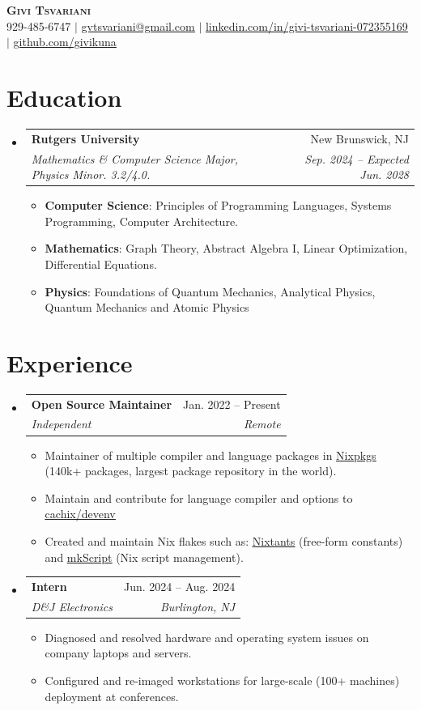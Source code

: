 \documentclass[letterpaper,11pt]{article}
\makeatletter
\newcommand{\resumeItem}[1]{
  \item\small{
    {#1 \vspace{-2pt}}
  }
}
\newcommand{\resumeSubheading}[4]{
  \vspace{-2pt}\item
    \begin{tabular*}{0.97\textwidth}[t]{l@{\extracolsep{\fill}}r}
      \textbf{#1} & #2 \\
      \textit{\small#3} & \textit{\small #4} \\
    \end{tabular*}\vspace{-7pt}
}
\newcommand{\resumeSubHeadingListStart}{\begin{itemize}[leftmargin=0.15in, label={}]}
\newcommand{\resumeSubHeadingListEnd}{\end{itemize}}
\newcommand{\resumeItemListStart}{\begin{itemize}}
\newcommand{\resumeItemListEnd}{\end{itemize}\vspace{-5pt}}
\makeatother
\begin{document}
\begin{center}
    \textbf{\Huge \scshape Givi Tsvariani} \\ \vspace{1pt}
    \small 929-485-6747 $|$ \href{mailto:gvtsvariani@gmail.com}{\underline{gvtsvariani@gmail.com}} $|$ 
    \href{https://linkedin.com/in/givi-tsvariani-072355169}{\underline{linkedin.com/in/givi-tsvariani-072355169}} $|$
    \href{https://github.com/givikuna}{\underline{github.com/givikuna}}
\end{center}

\section{Education}
  \resumeSubHeadingListStart
  \resumeSubheading
  {Rutgers University}{New Brunswick, NJ}
  {Mathematics \& Computer Science Major, Physics Minor. 3.2/4.0.}{Sep. 2024 -- Expected Jun. 2028}
\resumeItemListStart
  \resumeItem{\textbf{Computer Science}: Principles of Programming Languages, Systems Programming, Computer Architecture.}
  \resumeItem{\textbf{Mathematics}: Graph Theory, Abstract Algebra I, Linear Optimization, Differential Equations.}
  \resumeItem{\textbf{Physics}: Foundations of Quantum Mechanics, Analytical Physics, Quantum Mechanics and Atomic Physics}
\resumeItemListEnd
  \resumeSubHeadingListEnd

\section{Experience}
  \resumeSubHeadingListStart
  \resumeSubheading
  {Open Source Maintainer}{Jan. 2022 -- Present}
  {Independent}{Remote}
\resumeItemListStart
  \resumeItem{Maintainer of multiple compiler and language packages in \href{https://github.com/nixos/nixpkgs}{\underline{Nixpkgs}} (140k+ packages, largest package repository in the world).}
  \resumeItem{Maintain and contribute for language compiler and options to \href{https://github.com/cachix/devenv}{\underline{cachix/devenv}}}
  \resumeItem{Created and maintain Nix flakes such as: \href{https://github.com/givikuna/nixtants}{\underline{Nixtants}} (free-form constants) and \href{https://github.com/givikuna/nix-mkScript}{\underline{mkScript}} (Nix script management).}
\resumeItemListEnd
 \resumeSubheading
  {Intern}{Jun. 2024 -- Aug. 2024}
  {D\&J Electronics}{Burlington, NJ}
\resumeItemListStart
  \resumeItem{Diagnosed and resolved hardware and operating system issues on company laptops and servers.}
  \resumeItem{Configured and re-imaged workstations for large-scale (100+ machines) deployment at conferences.}
\resumeItemListEnd
  \resumeSubHeadingListEnd
\end{document}
